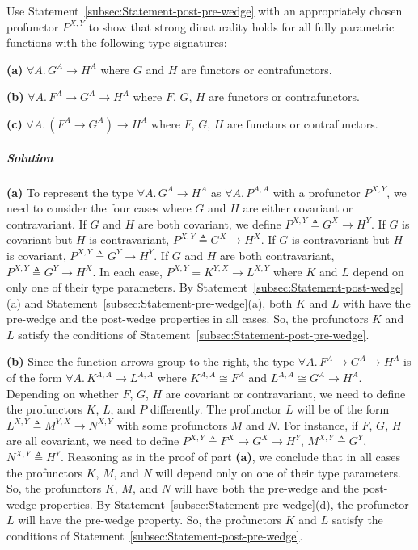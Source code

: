 Use Statement~\ref{subsec:Statement-post-pre-wedge} with an appropriately
chosen profunctor $P^{X,Y}$ to show that strong dinaturality holds
for all fully parametric functions with the following type signatures:

\textbf{(a)} $\forall A.\,G^{A}\rightarrow H^{A}$ where $G$ and
$H$ are functors or contrafunctors.

\textbf{(b)} $\forall A.\,F^{A}\rightarrow G^{A}\rightarrow H^{A}$
where $F$, $G$, $H$ are functors or contrafunctors.

\textbf{(c)} $\forall A.\,(F^{A}\rightarrow G^{A})\rightarrow H^{A}$
where $F$, $G$, $H$ are functors or contrafunctors.

\subparagraph{Solution}

\textbf{(a)} To represent the type $\forall A.\,G^{A}\rightarrow H^{A}$
as $\forall A.\,P^{A,A}$ with a profunctor $P^{X,Y}$, we need to
consider the four cases where $G$ and $H$ are either covariant or
contravariant. If $G$ and $H$ are both covariant, we define $P^{X,Y}\triangleq G^{X}\rightarrow H^{Y}$.
If $G$ is covariant but $H$ is contravariant, $P^{X,Y}\triangleq G^{X}\rightarrow H^{X}$.
If $G$ is contravariant but $H$ is covariant, $P^{X,Y}\triangleq G^{Y}\rightarrow H^{Y}$.
If $G$ and $H$ are both contravariant, $P^{X,Y}\triangleq G^{Y}\rightarrow H^{X}$.
In each case, $P^{X,Y}=K^{Y,X}\rightarrow L^{X,Y}$ where $K$ and
$L$ depend on only one of their type parameters. By Statement~\ref{subsec:Statement-post-wedge}(a)
and Statement~\ref{subsec:Statement-pre-wedge}(a), both $K$ and
$L$ with have the pre-wedge and the post-wedge properties in all
cases. So, the profunctors $K$ and $L$ satisfy the conditions of
Statement~\ref{subsec:Statement-post-pre-wedge}.

\textbf{(b)} Since the function arrows group to the right, the type
$\forall A.\,F^{A}\rightarrow G^{A}\rightarrow H^{A}$ is of the form
$\forall A.\,K^{A,A}\rightarrow L^{A,A}$ where $K^{A,A}\cong F^{A}$
and $L^{A,A}\cong G^{A}\rightarrow H^{A}$. Depending on whether $F$,
$G$, $H$ are covariant or contravariant, we need to define the profunctors
$K$, $L$, and $P$ differently. The profunctor $L$ will be of the
form $L^{X,Y}\triangleq M^{Y,X}\rightarrow N^{X,Y}$ with some profunctors
$M$ and $N$. For instance, if $F$, $G$, $H$ are all covariant,
we need to define $P^{X,Y}\triangleq F^{X}\rightarrow G^{X}\rightarrow H^{Y}$,
$M^{X,Y}\triangleq G^{Y}$, $N^{X,Y}\triangleq H^{Y}$. Reasoning
as in the proof of part \textbf{(a)}, we conclude that in all cases
the profunctors $K$, $M$, and $N$ will depend only on one of their
type parameters. So, the profunctors $K$, $M$, and $N$ will have
both the pre-wedge and the post-wedge properties. By Statement~\ref{subsec:Statement-pre-wedge}(d),
the profunctor $L$ will have the pre-wedge property. So, the profunctors
$K$ and $L$ satisfy the conditions of Statement~\ref{subsec:Statement-post-pre-wedge}.

